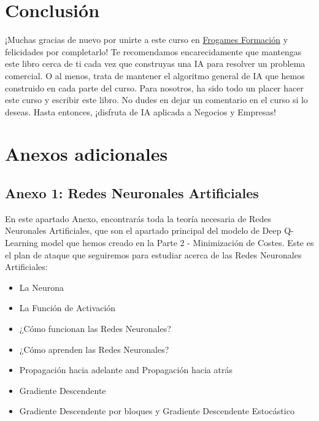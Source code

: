 \documentclass[
]{book}
\providecommand{\tightlist}{%
  \setlength{\itemsep}{0pt}\setlength{\parskip}{0pt}}
\begin{document}
\hypertarget{conclusiuxf3n}{%
\chapter*{Conclusión}\label{conclusiuxf3n}}

¡Muchas gracias de nuevo por unirte a este curso en \href{https://cursos.frogamesformacion.com/courses/ia-aplicada-negocios?et=paid\&ref=846b3f\&coupon=frogames30}{Frogames Formación} y felicidades por completarlo! Te recomendamos encarecidamente que mantengas este libro cerca de ti cada vez que construyas una IA para resolver un problema comercial. O al menos, trata de mantener el algoritmo general de IA que hemos construido en cada parte del curso. Para nosotros, ha sido todo un placer hacer este curso y escribir este libro. No dudes en dejar un comentario en el curso si lo deseas. Hasta entonces, ¡disfruta de IA aplicada a Negocios y Empresas!

\hypertarget{anexos-adicionales}{%
\chapter{Anexos adicionales}\label{anexos-adicionales}}

\hypertarget{anexo-1-redes-neuronales-artificiales}{%
\section{Anexo 1: Redes Neuronales Artificiales}\label{anexo-1-redes-neuronales-artificiales}}

En este apartado Anexo, encontrarás toda la teoría necesaria de Redes Neuronales Artificiales, que son el apartado principal del modelo de Deep Q-Learning model que hemos creado en la Parte 2 - Minimización de Costes. Este es el plan de ataque que seguiremos para estudiar acerca de las Redes Neuronales Artificiales:

\begin{itemize}
\tightlist
\item
  La Neurona
\item
  La Función de Activación
\item
  ¿Cómo funcionan las Redes Neuronales?
\item
  ¿Cómo aprenden las Redes Neuronales?
\item
  Propagación hacia adelante and Propagación hacia atrás
\item
  Gradiente Descendente
\item
  Gradiente Descendente por bloques y Gradiente Descendente Estocástico
\end{itemize}
\end{document}
